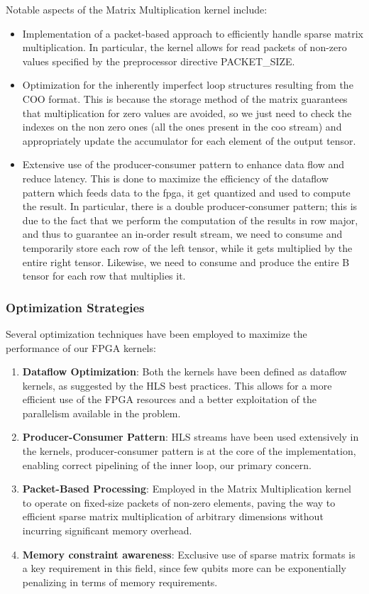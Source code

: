 \documentclass[12pt,oneside,a4paper]{article}
\begin{document}
Notable aspects of the Matrix Multiplication kernel include:

\begin{itemize}
    \item Implementation of a packet-based approach to efficiently handle sparse matrix multiplication. In particular, the kernel allows for read packets of non-zero values specified by the preprocessor directive PACKET\_SIZE.
    \item Optimization for the inherently imperfect loop structures resulting from the COO format. This is because the storage method of the matrix guarantees that multiplication for zero values are avoided, so we just need to check the indexes on the non zero ones (all the ones present in the coo stream) and appropriately update the accumulator for each element of the output tensor.
    \item Extensive use of the producer-consumer pattern to enhance data flow and reduce latency. This is done to maximize the efficiency of the dataflow pattern which feeds data to the fpga, it get quantized and used to compute the result. In particular, there is a double producer-consumer pattern; this is due to the fact that we perform the computation of the results in row major, and thus to guarantee an in-order result stream, we need to consume and temporarily store each row of the left tensor, while it gets multiplied by the entire right tensor. Likewise, we need to consume and produce the entire B tensor for each row that multiplies it.
\end{itemize}

\subsubsection{Optimization Strategies}

Several optimization techniques have been employed to maximize the performance of our FPGA kernels:

\begin{enumerate}
    \item \textbf{Dataflow Optimization}: Both the kernels have been defined as dataflow kernels, as suggested by the HLS best practices. This allows for a more efficient use of the FPGA resources and a better exploitation of the parallelism available in the problem.
    \item \textbf{Producer-Consumer Pattern}: HLS streams have been used extensively in the kernels, producer-consumer pattern is at the core of the implementation, enabling correct pipelining of the inner loop, our primary concern.
    \item \textbf{Packet-Based Processing}: Employed in the Matrix Multiplication kernel to operate on fixed-size packets of non-zero elements, paving the way to efficient sparse matrix multiplication of arbitrary dimensions without incurring significant memory overhead.
    \item \textbf{Memory constraint awareness}: Exclusive use of sparse matrix formats is a key requirement in this field, since few qubits more can be exponentially penalizing in terms of memory requirements.
\end{enumerate}
\end{document}
